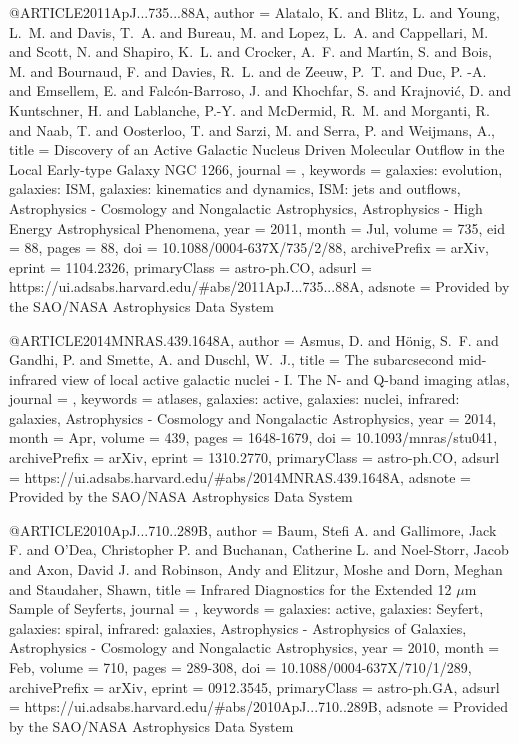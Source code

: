 \documentclass[longauth]{aa}
\begin{document}
@ARTICLE{2011ApJ...735...88A,
       author = {{Alatalo}, K. and {Blitz}, L. and {Young}, L.~M. and {Davis}, T.~A. and {Bureau}, M. and {Lopez}, L.~A. and {Cappellari}, M. and {Scott}, N. and {Shapiro}, K.~L. and {Crocker}, A.~F. and {Mart{\'\i}n}, S. and {Bois}, M. and {Bournaud}, F. and {Davies}, R.~L. and {de Zeeuw}, P.~T. and {Duc}, P. -A. and {Emsellem}, E. and {Falc{\'o}n-Barroso}, J. and {Khochfar}, S. and {Krajnovi{\'c}}, D. and {Kuntschner}, H. and {Lablanche}, P.-Y. and {McDermid}, R.~M. and {Morganti}, R. and {Naab}, T. and {Oosterloo}, T. and {Sarzi}, M. and {Serra}, P. and {Weijmans}, A.},
        title = {Discovery of an Active Galactic Nucleus Driven Molecular Outflow in the Local Early-type Galaxy NGC 1266},
      journal = {\apj},
     keywords = {galaxies: evolution, galaxies: ISM, galaxies: kinematics and dynamics, ISM: jets and outflows, Astrophysics - Cosmology and Nongalactic Astrophysics, Astrophysics - High Energy Astrophysical Phenomena},
         year = 2011,
        month = Jul,
       volume = {735},
          eid = {88},
        pages = {88},
          doi = {10.1088/0004-637X/735/2/88},
archivePrefix = {arXiv},
       eprint = {1104.2326},
 primaryClass = {astro-ph.CO},
       adsurl = {https://ui.adsabs.harvard.edu/#abs/2011ApJ...735...88A},
      adsnote = {Provided by the SAO/NASA Astrophysics Data System}
}

@ARTICLE{2014MNRAS.439.1648A,
       author = {{Asmus}, D. and {H{\"o}nig}, S.~F. and {Gandhi}, P. and {Smette}, A. and {Duschl}, W.~J.},
        title = {The subarcsecond mid-infrared view of local active galactic nuclei - I. The N- and Q-band imaging atlas},
      journal = {\mnras},
     keywords = {atlases, galaxies: active, galaxies: nuclei, infrared: galaxies,
        Astrophysics - Cosmology and Nongalactic Astrophysics},
         year = 2014,
        month = Apr,
       volume = {439},
        pages = {1648-1679},
          doi = {10.1093/mnras/stu041},
archivePrefix = {arXiv},
       eprint = {1310.2770},
 primaryClass = {astro-ph.CO},
       adsurl = {https://ui.adsabs.harvard.edu/#abs/2014MNRAS.439.1648A},
      adsnote = {Provided by the SAO/NASA Astrophysics Data System}
}

@ARTICLE{2010ApJ...710..289B,
       author = {{Baum}, Stefi A. and {Gallimore}, Jack F. and {O'Dea}, Christopher P. and {Buchanan}, Catherine L. and {Noel-Storr}, Jacob and {Axon}, David J. and {Robinson}, Andy and {Elitzur}, Moshe and {Dorn}, Meghan and {Staudaher}, Shawn},
        title = {Infrared Diagnostics for the Extended 12 {\ensuremath{\mu}}m Sample of Seyferts},
      journal = {\apj},
     keywords = {galaxies: active, galaxies: Seyfert, galaxies: spiral, infrared: galaxies, Astrophysics - Astrophysics of Galaxies, Astrophysics - Cosmology and Nongalactic Astrophysics},
         year = 2010,
        month = Feb,
       volume = {710},
        pages = {289-308},
          doi = {10.1088/0004-637X/710/1/289},
archivePrefix = {arXiv},
       eprint = {0912.3545},
 primaryClass = {astro-ph.GA},
       adsurl = {https://ui.adsabs.harvard.edu/#abs/2010ApJ...710..289B},
      adsnote = {Provided by the SAO/NASA Astrophysics Data System}
}
\end{document}
